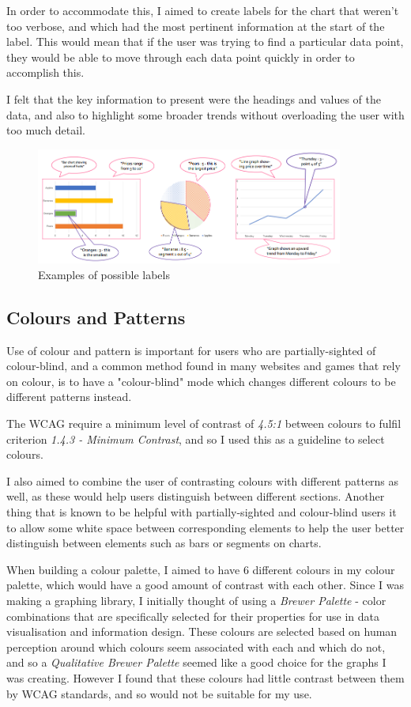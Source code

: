 \documentclass[ %
                    author={Aleena Baig},
                supervisor={Dr Simon Lock},
                    degree={BSc},
                     title={On Making Web Accessible Graphs},
                  subtitle={},
                      year={2019} ]{dissertation}
\begin{document}
In order to accommodate this, I aimed to create labels for the chart that weren't too verbose, and which had the most pertinent information at the start of the label. This would mean that if the user was trying to find a particular data point, they would be able to move through each data point quickly in order to accomplish this.

I felt that the key information to present were the headings and values of the data, and also to highlight some broader trends without overloading the user with too much detail.

\begin{figure}[h]
\caption{Examples of possible labels}
\centering
\includegraphics[width=0.9\textwidth]{images/GraphDesignWithReadouts.PNG}
\end{figure}

\subsection{Colours and Patterns}

Use of colour and pattern is important for users who are partially-sighted of colour-blind, and a common method found in many websites and games that rely on colour, is to have a "colour-blind" mode which changes different colours to be different patterns instead.

The WCAG require a minimum level of contrast of \textit{4.5:1} between colours to fulfil criterion \textit{1.4.3 - Minimum Contrast}, and so I used this as a guideline to select colours.

I also aimed to combine the user of contrasting colours with different patterns as well, as these would help users distinguish between different sections. Another thing that is known to be helpful with partially-sighted and colour-blind users it to allow some white space between corresponding elements to help the user better distinguish between elements such as bars or segments on charts.

When building a colour palette, I aimed to have 6 different colours in my colour palette, which would have a good amount of contrast with each other. Since I was making a graphing library, I initially thought of using a \textit{Brewer Palette} - color combinations that are specifically selected for their properties for use in data visualisation and information design. These colours are selected based on human perception around which colours seem associated with each and which do not, and so a \textit{Qualitative Brewer Palette} seemed like a good choice for the graphs I was creating. However I found that these colours had little contrast between them by WCAG standards, and so would not be suitable for my use.
\end{document}
